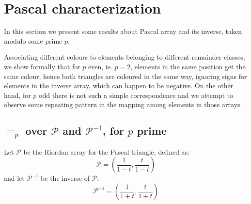 
\section{Pascal characterization}

In this section we present some results about Pascal array and
its inverse, taken modulo some prime $p$. 

Associating different colours to elements belonging to different remainder
classes, we show formally that for $p$ even, ie. $p=2$, elements in the same
position get the same colour, hence both triangles are coloured in the same
way, ignoring signs for elements in the inverse array, which can happen to be
negative. On the other hand, for $p$ odd there is not such a simple
correspondence and we attempt to observe some repeating pattern in the mapping
among elements in those arrays.

\subsection{$\equiv_{p}$ over $\mathcal{P}$ and $\mathcal{P}^{-1}$,
    for $p$ prime}

Let $\mathcal{P}$ be the Riordan array for the Pascal triangle,
defined as:
\begin{displaymath} 
    \mathcal{P} = \left(\frac{1}{1-t}, \frac{t}{1-t}  \right)
\end{displaymath} 
and let $\mathcal{P}^{-1}$ be the inverse of $\mathcal{P}$:
\begin{displaymath} 
    \mathcal{P}^{-1} = \left(\frac{1}{1+t}, \frac{t}{1+t}  \right)
\end{displaymath} 

